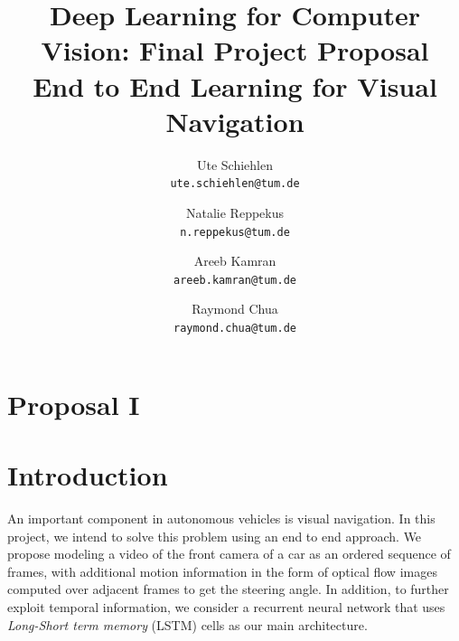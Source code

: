 \documentclass[10pt,twocolumn,letterpaper]{article}
\begin{document}
\title{Deep Learning for Computer Vision: Final Project Proposal\\End to End Learning for Visual Navigation}

\author{Ute Schiehlen\\
{\tt\small ute.schiehlen@tum.de}
\and
Natalie Reppekus\\
{\tt\small n.reppekus@tum.de}
\and
Areeb Kamran\\
{\tt\small areeb.kamran@tum.de}
\and
Raymond Chua\\
{\tt\small raymond.chua@tum.de}
}

\maketitle

%
%
\section*{Proposal I}
\section{Introduction}

An important component in autonomous vehicles is visual navigation. In this project, we intend to solve this problem using an end to end approach. We propose modeling a video of the front camera of a car as an ordered sequence of frames, with additional motion information in the form of optical flow images computed over adjacent frames to get the steering angle. In addition, to further exploit temporal information, we consider a recurrent neural network that uses {\em Long-Short term memory} (LSTM) cells as our main architecture. 
\end{document}
